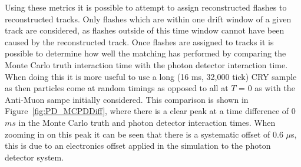 Using these metrics it is possible to attempt to assign reconstructed flashes to reconstructed tracks. Only flashes which are within one drift window of a given track are considered, as flashes outside of this time window cannot have been caused by the reconstructed track. Once flashes are assigned to tracks it is possible to determine how well the matching has performed by comparing the Monte Carlo truth interaction time with the photon detector interaction time. When doing this it is more useful to use a long (16 ms, 32,000 tick) CRY sample as then particles come at random timings as opposed to all at $T$ = 0 as with the Anti-Muon sampe initially considered. This comparison is shown in Figure~\ref{fig:PD_MCPDDiff}, where there is a clear peak at a time difference of 0 $ms$ in the Monte Carlo truth and photon detector interaction times. When zooming in on this peak it can be seen that there is a systematic offset of 0.6 $\mu$s, this is due to an electronics offset applied in the simulation to the photon detector system. \\

